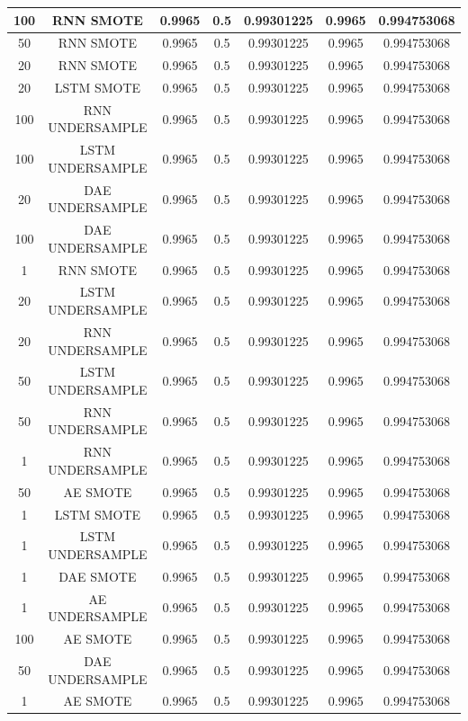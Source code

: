 \begin{longtable}{|c|c|c|c|c|c|c|}
  	100 & RNN SMOTE & 0.9965 & 0.5 & 0.99301225 & 0.9965 & 0.994753068\\ \hline
  	50 & RNN SMOTE & 0.9965 & 0.5 & 0.99301225 & 0.9965 & 0.994753068\\ \hline
  	20 & RNN SMOTE & 0.9965 & 0.5 & 0.99301225 & 0.9965 & 0.994753068\\ \hline
  	20 & LSTM SMOTE & 0.9965 & 0.5 & 0.99301225 & 0.9965 & 0.994753068\\ \hline
  	100 & RNN UNDERSAMPLE & 0.9965 & 0.5 & 0.99301225 & 0.9965 & 0.994753068\\ \hline
  	100 & LSTM UNDERSAMPLE & 0.9965 & 0.5 & 0.99301225 & 0.9965 & 0.994753068\\ \hline
  	20 & DAE UNDERSAMPLE & 0.9965 & 0.5 & 0.99301225 & 0.9965 & 0.994753068\\ \hline
  	100 & DAE UNDERSAMPLE & 0.9965 & 0.5 & 0.99301225 & 0.9965 & 0.994753068\\ \hline
  	1 & RNN SMOTE & 0.9965 & 0.5 & 0.99301225 & 0.9965 & 0.994753068\\ \hline
  	20 & LSTM UNDERSAMPLE & 0.9965 & 0.5 & 0.99301225 & 0.9965 & 0.994753068\\ \hline
  	20 & RNN UNDERSAMPLE & 0.9965 & 0.5 & 0.99301225 & 0.9965 & 0.994753068\\ \hline
  	50 & LSTM UNDERSAMPLE & 0.9965 & 0.5 & 0.99301225 & 0.9965 & 0.994753068\\ \hline
  	50 & RNN UNDERSAMPLE & 0.9965 & 0.5 & 0.99301225 & 0.9965 & 0.994753068\\ \hline
  	1 & RNN UNDERSAMPLE & 0.9965 & 0.5 & 0.99301225 & 0.9965 & 0.994753068\\ \hline
  	50 & AE SMOTE & 0.9965 & 0.5 & 0.99301225 & 0.9965 & 0.994753068\\ \hline
  	1 & LSTM SMOTE & 0.9965 & 0.5 & 0.99301225 & 0.9965 & 0.994753068\\ \hline
  	1 & LSTM UNDERSAMPLE & 0.9965 & 0.5 & 0.99301225 & 0.9965 & 0.994753068\\ \hline
  	1 & DAE SMOTE & 0.9965 & 0.5 & 0.99301225 & 0.9965 & 0.994753068\\ \hline
  	1 & AE UNDERSAMPLE & 0.9965 & 0.5 & 0.99301225 & 0.9965 & 0.994753068\\ \hline
  	100 & AE SMOTE & 0.9965 & 0.5 & 0.99301225 & 0.9965 & 0.994753068\\ \hline
  	50 & DAE UNDERSAMPLE & 0.9965 & 0.5 & 0.99301225 & 0.9965 & 0.994753068\\ \hline
  	1 & AE SMOTE & 0.9965 & 0.5 & 0.99301225 & 0.9965 & 0.994753068\\ \hline

\end{longtable}
